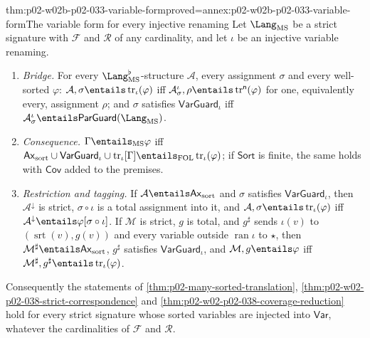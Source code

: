 \begin{hbtheorem}{thm:p02-w02b-p02-033-variable-form}{proved=annex:p02-w02b-p02-033-variable-form}{The variable form for every injective renaming}
Let \(\Lang_{\mathrm{MS}}\) be a strict signature with \(\mathcal F\) and
\(\mathcal R\) of any cardinality, and let \(\iota\) be an injective variable
renaming.
\begin{enumerate}
\item \emph{Bridge.}  For every \(\Lang_{\mathrm{MS}}^{\flat}\)-structure
      \(\mathcal A\), every assignment \(\sigma\) and every well-sorted
      \(\varphi\): \(\mathcal A,\sigma\entails\operatorname{tr}_{\iota}(\varphi)\)
      iff \(\mathcal A_{\sigma}^{\iota},\rho\entails
      \operatorname{tr}^{\mathsf n}(\varphi)\) for one, equivalently every,
      assignment \(\rho\); and \(\sigma\) satisfies
      \(\mathsf{VarGuard}_{\iota}\) iff
      \(\mathcal A_{\sigma}^{\iota}\entails\mathsf{ParGuard}(\Lang_{\mathrm{MS}})\).
\item \emph{Consequence.}  \(\Gamma\entails_{\mathrm{MS}}\varphi\) iff
      \(\mathsf{Ax}_{\mathrm{sort}}\cup\mathsf{VarGuard}_{\iota}\cup
      \operatorname{tr}_{\iota}[\Gamma]\entails_{\mathrm{FOL}}
      \operatorname{tr}_{\iota}(\varphi)\); if \(\mathsf{Sort}\) is finite,
      the same holds with \(\mathsf{Cov}\) added to the premises.
\item \emph{Restriction and tagging.}  If
      \(\mathcal A\entails\mathsf{Ax}_{\mathrm{sort}}\) and \(\sigma\)
      satisfies \(\mathsf{VarGuard}_{\iota}\), then \(\mathcal A^{\downarrow}\)
      is strict, \(\sigma\circ\iota\) is a total assignment into it,
      and \(\mathcal A,\sigma\entails\operatorname{tr}_{\iota}(\varphi)\) iff
      \(\mathcal A^{\downarrow}\entails\varphi[\sigma\circ\iota]\).
      If \(\mathcal M\) is strict, \(g\) is total, and \(g^{\sharp}\) sends
      \(\iota(v)\) to \((\operatorname{srt}(v),g(v))\) and every variable
      outside \(\operatorname{ran}\iota\) to \(\star\), then
      \(\mathcal M^{\sharp}\entails\mathsf{Ax}_{\mathrm{sort}}\),
      \(g^{\sharp}\) satisfies \(\mathsf{VarGuard}_{\iota}\), and
      \(\mathcal M,g\entails\varphi\) iff
      \(\mathcal M^{\sharp},g^{\sharp}\entails\operatorname{tr}_{\iota}(\varphi)\).
\end{enumerate}
Consequently the statements of \cref{thm:p02-many-sorted-translation},
\cref{thm:p02-w02-p02-038-strict-correspondence} and
\cref{thm:p02-w02-p02-038-coverage-reduction} hold for every strict signature
whose sorted variables are injected into \(\mathsf{Var}\), whatever the
cardinalities of \(\mathcal F\) and \(\mathcal R\).
\end{hbtheorem}

